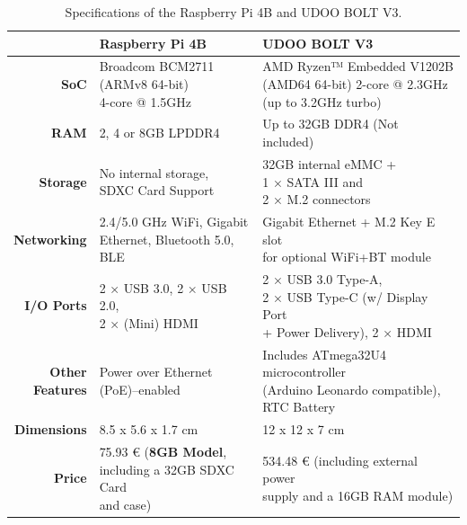 \renewcommand{\arraystretch}{2.5}
\begin{table}[H]
    \centering
    \begin{tabular}{r|l|l}
        & \textbf{Raspberry Pi 4B}& \textbf{UDOO BOLT V3}  \\ \hline
        \textbf{SoC} &  \makecell{Broadcom BCM2711 \\ (ARMv8 64-bit) \\ 4-core @ 1.5GHz} & \makecell{AMD Ryzen™ Embedded V1202B \\ (AMD64 64-bit) 2-core @ 2.3GHz \\ (up to 3.2GHz turbo)}\\
        \textbf{RAM} & 2, 4 or 8GB LPDDR4 & Up to 32GB DDR4 (Not included) \\ 
        \textbf{Storage} & \makecell{No internal storage, \\ SDXC Card Support} & \makecell{32GB internal eMMC + \\1 × SATA III and \\ 2 × M.2 connectors}\\
        \textbf{Networking} & \makecell{2.4/5.0 GHz WiFi, Gigabit \\ Ethernet, Bluetooth 5.0, BLE} & \makecell{Gigabit Ethernet + M.2 Key E slot \\ for optional WiFi+BT module}\\ 
        \textbf{I/O Ports} & \makecell{ 2 × USB 3.0, 2 × USB 2.0, \\ 2 × (Mini) HDMI} & \makecell{2 × USB 3.0 Type-A, \\ 2 × USB Type-C (w/ Display Port \\ + Power Delivery), 2 × HDMI} \\
        \makecell[r]{\textbf{Other} \\\textbf{Features}} & \makecell{Power over Ethernet \\(PoE)–enabled} & \makecell{Includes ATmega32U4 microcontroller\\ (Arduino Leonardo compatible), \\ RTC Battery} \\   
        \textbf{Dimensions} & 8.5 x 5.6 x 1.7 cm & 12 x 12 x 7 cm \\
        \textbf{Price} & \makecell{75.93 € (\textbf{8GB Model}, \\ including a 32GB SDXC Card\\ and case)} & \makecell{534.48 € (including external power \\ supply and a 16GB RAM module)} \\
    \end{tabular}
    \caption{Specifications of the Raspberry Pi 4B and UDOO BOLT V3.}
    \label{tab:comparsion-hardwareplatform}
\end{table}
\renewcommand{\arraystretch}{1}

